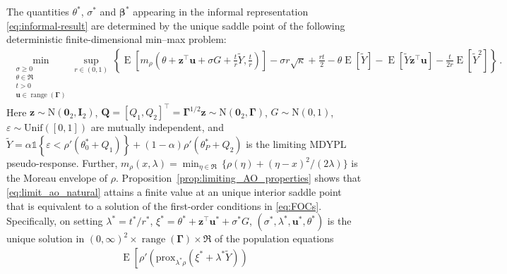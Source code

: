 \documentclass{article}
\DeclareMathOperator{\expect}{E}
\theoremstyle{definition}
\newcommand*{\bb}{\boldsymbol}
\newcommand{\prox}[2]{\ensuremath{\textrm{prox}_{#1}\left(#2\right)}}
\def\bu{\bb{u}}
\def\Ytil{\widetilde{Y}}
\def\bbeta{\bb{\beta}}
\def\bz{\bb{z}}
\newcommand{\range}{\operatorname{range}}
\begin{document}
\begin{bibunit}
The quantities $\theta^*$, $\sigma^*$ and $\bbeta^*$ appearing in the
informal representation \eqref{eq:informal-result} are determined by the
unique saddle point of the following deterministic finite-dimensional
min--max problem:
\begin{equation}
\label{eq:limit_ao_natural}
\begin{aligned}
    \underset{\substack{
        \sigma\geq0\\
        \theta\in\Re\\
        t>0\\
        \bu\in\range(\bb\Gamma)
    }}{\min}
    \underset{r\in(0,1)}{\sup} \, 
    \left\{
        \expect
        \left[
            m_\rho
            \left(
                \theta+\bz^\top\bu+\sigma G
                +\frac{t}{r}\Ytil,
                \frac{t}{r}
            \right)
        \right]
        -
        \sigma r\sqrt\kappa
        +
        \frac{rt}{2}
        -
        \theta\expect[\Ytil]
        -
        \expect[\Ytil\bz^\top\bu]
        -
        \frac{t}{2r}\expect[\Ytil^2]
    \right\}\,.
\end{aligned}
\end{equation}
Here $\bz\sim\mathrm N(\bb0_2,\bb I_2)$, $\bb Q
    =[Q_1, Q_2]^\top 
    =
    \bb\Gamma^{1/2}\bz
    \sim
    \mathrm N(\bb0_2,\bb\Gamma)$, $G\sim\mathrm N(0,1)$, $
    \varepsilon\sim\mathrm{Unif}([0,1])$ 
are mutually independent, and $\Ytil
    =
    \alpha
    \mathds{1}
    \left\{
        \varepsilon
        <
        \rho'(\theta_0^*+Q_1)
    \right\}
    +
    (1-\alpha)
    \rho'(\theta_P^*+Q_2)$
is the limiting MDYPL pseudo-response. Further,
$
    m_\rho(x,\lambda)
    =
    \min_{\eta\in\Re} \, 
    \{
        \rho(\eta)
        +
        (\eta-x)^2 / (2 \lambda)
    \}
$
is the Moreau envelope of $\rho$. 
Proposition~\ref{prop:limiting_AO_properties} shows that
\eqref{eq:limit_ao_natural} attains a finite value at an unique
interior saddle point that is equivalent to a solution of the first-order conditions in \eqref{eq:FOCs}. Specifically, on
setting
$
    \lambda^*
    =
    {t^*} / {r^*}$, 
    $
    \xi^*
    =
    \theta^*
    +
    \bz^\top\bu^*
    +
    \sigma^*G
$, 
$(\sigma^*,\lambda^*,\bu^*,\theta^*)$ is the unique solution in
$(0,\infty)^2\times\range(\bb\Gamma)\times\Re$ of the population
equations
\begin{equation}
\label{eq:FOCs}
\begin{aligned}
    \expect
    \left[
        \rho'
        \left(
            \prox{\lambda^*\rho}
            {\xi^*+\lambda^*\Ytil}
        \right)

\end{aligned}
\end{equation}
\end{bibunit}
\end{document}
